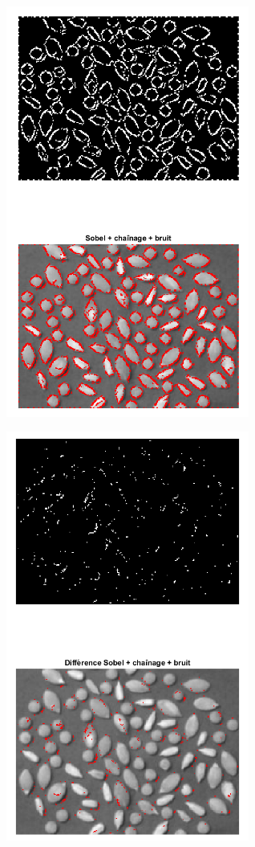 \documentclass{article}
\begin{document}
\begin{itemize}[leftmargin=*]
\begin{itemize}[leftmargin=*]
\begin{minipage}[c]{0.46\linewidth}		
	\includegraphics[width=8cm]{Sobel_link_noise20.png}
\end{minipage}\hfill
\begin{minipage}[c]{0.46\linewidth}
	\includegraphics[width=8cm]{Diff_Sobel_link_noise20.png}
\end{minipage}\hfill
	\end{itemize}
	

\end{itemize}
\end{document}
